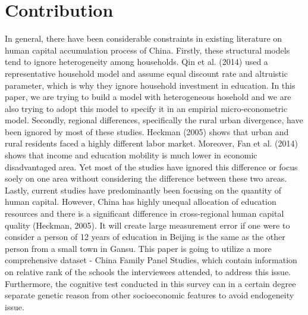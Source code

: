 \documentclass[12pt]{article}%
\theoremstyle{definition}
\numberwithin{equation}{section}
\begin{document}
\section{Contribution}
In general, there have been considerable constraints in existing literature on human capital accumulation process of China. Firstly, these structural models tend to ignore heterogeneity among households. Qin et al. (2014) used a representative household model and assume equal discount rate and altruistic parameter, which is why they ignore household investment in education. In this paper, we are trying to build a model with heterogeneous hosehold and we are also trying to adopt this model to specify it in an empirial micro-econometric model. Secondly, regional differences, specifically the rural urban divergence, have been ignored by most of these studies. Heckman (2005) shows that urban and rural residents faced a highly different labor market. Moreover, Fan et al. (2014) shows that income and education mobility is much lower in economic disadvantaged area. Yet most of the studies have ignored this difference or focus soely on one area without considering the difference between these two areas. Lastly, current studies have predominantly been focusing on the quantity of human capital. However, China has highly unequal allocation of education resources  and there is a significant difference in cross-regional human capital quality (Heckman, 2005). It will create large measurement error if one were to consider a person of 12 years of education in Beijing is the same as the other person from a small town in Gansu. This paper is going to utilize a more comprehensive dataset - China Family Panel Studies, which contain information on relative rank of the schools the interviewees attended, to address this issue. Furthermore, the cognitive test conducted in this survey can in a certain degree separate genetic reason from other socioeconomic features to avoid endogeneity issue. \par
\end{document}
